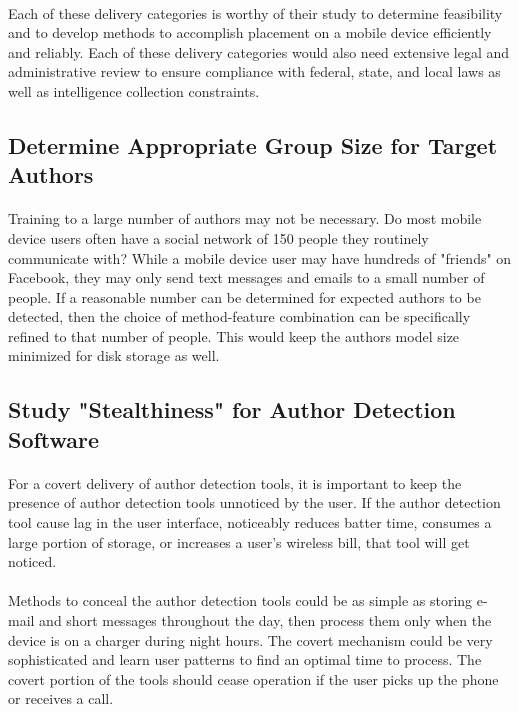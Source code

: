 	\paragraph*{} Each of these delivery categories is worthy of their study to determine feasibility and to develop methods to accomplish placement on a mobile device efficiently and reliably.  Each of these delivery categories would also need extensive legal and administrative review to ensure compliance with federal, state, and local laws as well as intelligence collection constraints.

\subsection{Determine Appropriate Group Size for Target Authors}
\paragraph*{}  Training to a large number of authors may not be necessary.  Do most mobile device users often have a social network of 150 people they routinely communicate with?  While a mobile device user may have hundreds of "friends" on Facebook, they may only send text messages and emails to a small number of people.  If a reasonable number can be determined for expected authors to be detected, then the choice of method-feature combination can be specifically refined to that number of people.  This would keep the authors model size minimized for disk storage as well.


\subsection{Study "Stealthiness" for Author Detection Software}
\paragraph*{} For a covert delivery of author detection tools, it is important to keep the presence of author detection tools unnoticed by the user.  If the author detection tool cause lag in the user interface, noticeably reduces batter time, consumes a large portion of storage, or increases a user's wireless bill, that tool will get noticed.
\paragraph*{} Methods to conceal the author detection tools could be as simple as storing e-mail and short messages throughout the day, then process them only when the device is on a charger during night hours.  The covert mechanism could be very sophisticated and learn user patterns to find an optimal time to process.  The covert portion of the tools should cease operation if the user picks up the phone or receives a call.
